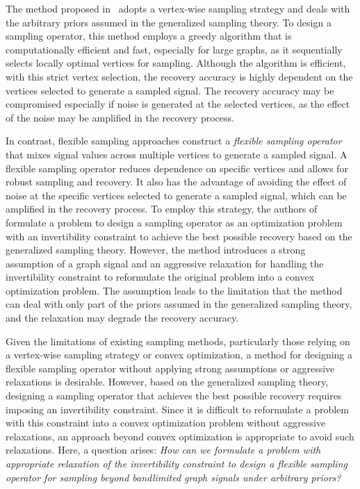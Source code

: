 \documentclass[journal]{IEEEtran}
\begin{document}
The method proposed in~\cite{hara2022gsss} adopts a vertex-wise sampling strategy and deals with the arbitrary priors assumed in the generalized sampling theory.
To design a sampling operator, this method employs a greedy algorithm that is computationally efficient and fast, especially for large graphs, as it sequentially selects locally optimal vertices for sampling.
Although the algorithm is efficient, with this strict vertex selection, the recovery accuracy is highly dependent on the vertices selected to generate a sampled signal. 
The recovery accuracy may be compromised especially if noise is generated at the selected vertices, as the effect of the noise may be amplified in the recovery process.

In contrast, flexible sampling approaches construct a \textit{flexible sampling operator} that mixes signal values across multiple vertices to generate a sampled signal.
A flexible sampling operator reduces dependence on specific vertices and allows for robust sampling and recovery.
It also has the advantage of avoiding the effect of noise at the specific vertices selected to generate a sampled signal, which can be amplified in the recovery process.
To employ this strategy, the authors of~\cite{hara2021design} formulate a problem to design a sampling operator as an optimization problem with an invertibility constraint to achieve the best possible recovery based on the generalized sampling theory.
However, the method introduces a strong assumption of a graph signal and an aggressive relaxation for handling the invertibility constraint to reformulate the original problem into a convex optimization problem.
The assumption leads to the limitation that the method can deal with only part of the priors assumed in the generalized sampling theory, and the relaxation may degrade the recovery accuracy.

Given the limitations of existing sampling methods, particularly those relying on a vertex-wise sampling strategy or convex optimization, a method for designing a flexible sampling operator without applying strong assumptions or aggressive relaxations is desirable.
However, based on the generalized sampling theory, designing a sampling operator that achieves the best possible recovery requires imposing an invertibility constraint.
Since it is difficult to reformulate a problem with this constraint into a convex optimization problem without aggressive relaxations, an approach beyond convex optimization is appropriate to avoid such relaxations.
Here, a question arises:
\textit{How can we formulate a problem with appropriate relaxation of the invertibility constraint to design a flexible sampling operator for sampling beyond bandlimited graph signals under arbitrary priors?}
\end{document}
